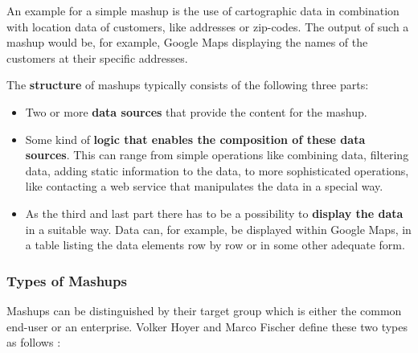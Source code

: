 An example for a simple mashup is the use of cartographic data
in combination with location data of customers, like addresses or zip-codes. The
output of such a mashup would be, for example, Google Maps displaying the names
of the customers at their specific addresses.

The \textbf{structure} of mashups typically consists of the following three parts:
\begin{itemize}
	\item Two or more \textbf{data sources} that provide the content for the
	mashup.
	\item Some kind of \textbf{logic that enables the composition of these data sources}. This can
	range from simple operations like combining data, filtering data, adding static information to
	the data, to more sophisticated operations, like contacting a web service that manipulates the
	data in a special way.
	\item As the third and last part there has to be a possibility to \textbf{display the
	data} in a suitable way. Data can, for example, be displayed within Google Maps, in a table
	listing the data elements row by row or in some other adequate form.
\end{itemize}

\subsubsection{Types of Mashups}

Mashups can be distinguished by their target group which is either the common end-user or an
enterprise. Volker Hoyer and Marco Fischer define these two types as follows
\cite{types_of_mashups}:

